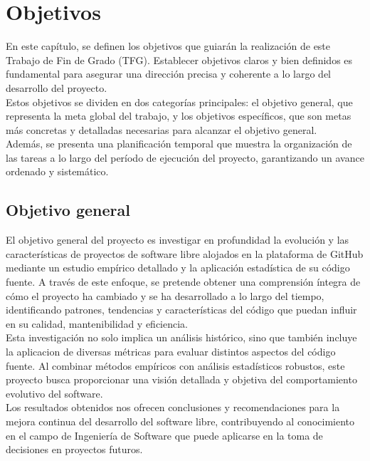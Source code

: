 \documentclass[a4paper, 12pt]{book}
\begin{document}

\cleardoublepage %
\chapter{Objetivos} %
\label{chap:objetivos} %

En este capítulo, se definen los objetivos que guiarán la realización de este Trabajo de Fin de Grado (TFG).
Establecer objetivos claros y bien definidos es fundamental para asegurar una dirección precisa y coherente
a lo largo del desarrollo del proyecto.
\\Estos objetivos se dividen en dos categorías principales: el objetivo general,
que representa la meta global del trabajo, y los objetivos específicos, que son metas más concretas y detalladas necesarias
para alcanzar el objetivo general. 
\\Además, se presenta una planificación temporal que muestra la organización de las tareas a lo largo
del período de ejecución del proyecto, garantizando un avance ordenado y sistemático.

\section{Objetivo general} %
\label{sec:objetivo-general} %

El objetivo general del proyecto es investigar en profundidad la evolución y las características de proyectos de software libre
alojados en la plataforma de GitHub mediante un estudio empírico detallado y la aplicación estadística de su código fuente. 
A través de este enfoque, se pretende obtener una comprensión íntegra de cómo el proyecto ha cambiado y se ha desarrollado a lo
largo del tiempo, identificando patrones, tendencias y características del código que puedan influir en su calidad, mantenibilidad y eficiencia.
\\Esta investigación no solo implica un análisis histórico, sino que también incluye la aplicacion de diversas métricas
para evaluar distintos aspectos del código fuente. 
Al combinar métodos empíricos con análisis estadísticos robustos, este proyecto busca proporcionar una visión detallada y objetiva
del comportamiento evolutivo del software.
\\Los resultados obtenidos nos ofrecen conclusiones y recomendaciones para la mejora continua del desarrollo del software libre,
contribuyendo al conocimiento en el campo de Ingeniería de Software que puede aplicarse en la toma de decisiones en proyectos futuros.
\end{document}
